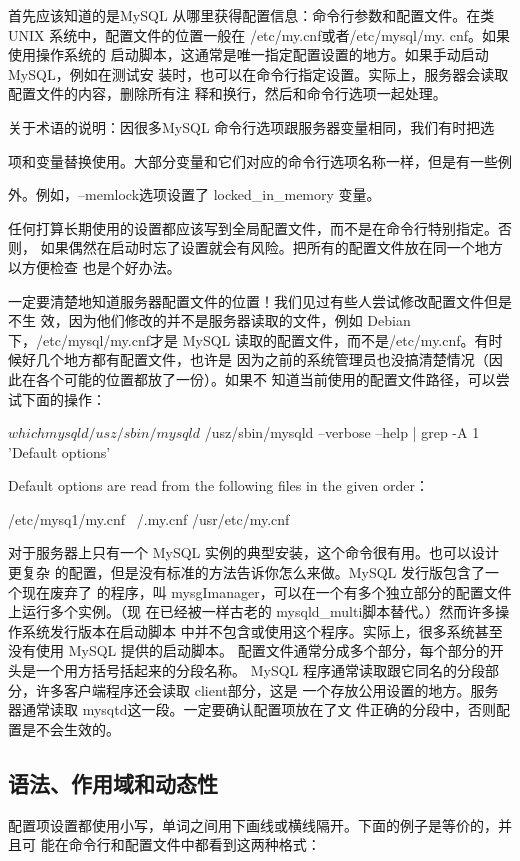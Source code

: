 首先应该知道的是MySQL 从哪里获得配置信息：命令行参数和配置文件。在类UNIX
系统中，配置文件的位置一般在 /etc/my.cnf或者/etc/mysql/my. cnf。如果使用操作系统的
启动脚本，这通常是唯一指定配置设置的地方。如果手动启动 MySQL，例如在测试安
装时，也可以在命令行指定设置。实际上，服务器会读取配置文件的内容，删除所有注
释和换行，然后和命令行选项一起处理。

关于术语的说明：因很多MySQL 命令行选项跟服务器变量相同，我们有时把选

项和变量替换使用。大部分变量和它们对应的命令行选项名称一样，但是有一些例

外。例如，--memlock选项设置了 locked\_in\_memory 变量。

任何打算长期使用的设置都应该写到全局配置文件，而不是在命令行特别指定。否则，
如果偶然在启动时忘了设置就会有风险。把所有的配置文件放在同一个地方以方便检查
也是个好办法。

一定要清楚地知道服务器配置文件的位置！我们见过有些人尝试修改配置文件但是不生
效，因为他们修改的并不是服务器读取的文件，例如 Debian 下，/etc/mysql/my.cnf才是
MySQL 读取的配置文件，而不是/etc/my.cnf。有时候好几个地方都有配置文件，也许是
因为之前的系统管理员也没搞清楚情况（因此在各个可能的位置都放了一份）。如果不
知道当前使用的配置文件路径，可以尝试下面的操作：

$ which mysqld

/usz/sbin/mysqld

$ /usz/sbin/mysqld --verbose --help | grep -A 1 'Default options'

Default options are read from the following files in the given order：

/etc/mysq1/my.cnf ~/.my.cnf /usr/etc/my.cnf

对于服务器上只有一个 MySQL 实例的典型安装，这个命令很有用。也可以设计更复杂
的配置，但是没有标准的方法告诉你怎么来做。MySQL 发行版包含了一个现在废弃了
的程序，叫 mysgImanager，可以在一个有多个独立部分的配置文件上运行多个实例。（现
在已经被一样古老的 mysqld\_multi脚本替代。）然而许多操作系统发行版本在启动脚本
中并不包含或使用这个程序。实际上，很多系统甚至没有使用 MySQL 提供的启动脚本。
配置文件通常分成多个部分，每个部分的开头是一个用方括号括起来的分段名称。
MySQL 程序通常读取跟它同名的分段部分，许多客户端程序还会读取 client部分，这是
一个存放公用设置的地方。服务器通常读取 mysqtd这一段。一定要确认配置项放在了文
件正确的分段中，否则配置是不会生效的。

\subsection{语法、作用域和动态性}
配置项设置都使用小写，单词之间用下画线或横线隔开。下面的例子是等价的，并且可
能在命令行和配置文件中都看到这两种格式：

